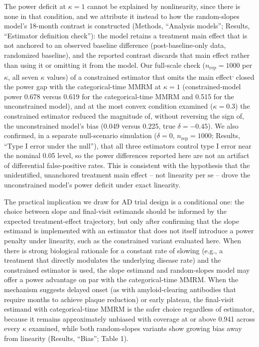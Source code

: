 \documentclass[
  11pt,
]{article}
\newcounter{none} %
\begin{document}
The power deficit at \(\kappa = 1\) cannot be explained by
nonlinearity, since there is none in that condition, and we
attribute it instead to how the random-slopes model's 18-month
contrast is constructed (Methods, ``Analysis models''; Results,
``Estimator definition check''): the model retains a treatment
main effect that is not anchored to an observed baseline
difference (post-baseline-only data, randomized baseline), and
the reported contrast discards that main effect rather than
using it or omitting it from the model. Our full-scale check
(\(n_{\mathrm{rep}} = 1000\) per \(\kappa\), all seven \(\kappa\)
values) of a constrained estimator that omits the main effect\textsuperscript{,}
closed the power gap with the categorical-time MMRM at \(\kappa = 1\)
(constrained-model power
0.678 versus
0.619 for the categorical-time
MMRM and 0.515 for the
unconstrained model), and at the most convex condition examined
(\(\kappa = 0.3\)) the constrained
estimator reduced the magnitude of, without reversing the sign of, the unconstrained model's
bias (0.049 versus
0.225, true
\(\delta = -0.45\)). We also confirmed, in a separate null-scenario
simulation (\(\delta = 0\), \(n_{\mathrm{rep}} = 1000\); Results,
``Type I error under the null''), that all three estimators
control type I error near the nominal 0.05 level, so the power
differences reported here are not an artifact of differential
false-positive rates.
This is consistent with the hypothesis that the unidentified, unanchored treatment main effect -- not linearity per se -- drove the unconstrained model's power deficit under exact linearity.

The practical implication we draw for AD trial design is a
conditional one: the choice between slope and final-visit
estimands should be informed by the expected treatment-effect
trajectory, but only after confirming that the slope estimand is
implemented with an estimator that does not itself introduce a
power penalty under linearity, such as the constrained variant
evaluated here.
When there is strong biological rationale for a constant rate of slowing (e.g., a treatment that directly modulates the underlying disease rate) and the constrained estimator is used, the slope estimand and random-slopes model may offer a power advantage on par with the categorical-time MMRM.
When the mechanism suggests delayed onset (as with
amyloid-clearing antibodies that require months to achieve
plaque reduction) or early plateau, the final-visit estimand
with categorical-time MMRM is the safer choice regardless of
estimator, because it remains approximately unbiased with
coverage at or above 0.941
across every \(\kappa\) examined, while both random-slopes variants
show growing bias away from linearity (Results, ``Bias''; Table 1).
\end{document}
